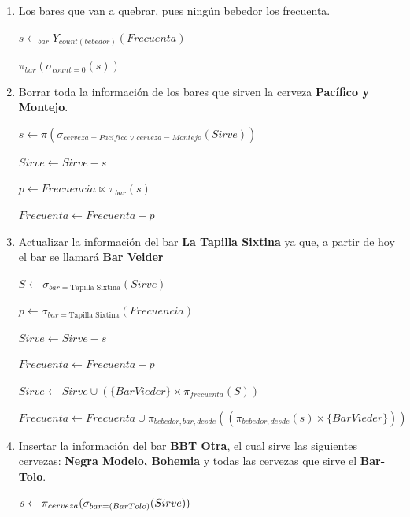 \documentclass{article}
\begin{document}
\begin{enumerate}
\begin{enumerate}
        $p \leftarrow_{cerveza}Y_{count(bebedor)}(Gusta)$
        
        $m \leftarrow Y_{max(count)}(p)$
        
        $c \leftarrow \pi_{cerveza}(\sigma{count=m}(p))$
        
        $c \bowtie Sirve$
        
        
        \item Los bares que van a quebrar, pues ningún bebedor los frecuenta.
        
        $s \leftarrow_{bar} Y_{count(bebedor)}(Frecuenta)$
        
        $\pi_{bar}(\sigma_{count=0}(s))$
        
        \item Borrar toda la información de los bares que sirven la cerveza \textbf{Pacífico y Montejo}.
        
        $s \leftarrow \pi(\sigma_{cerveza=Pacifico \vee cerveza=Montejo}(Sirve))$
        
        $Sirve \leftarrow Sirve - s$
        
        $p \leftarrow Frecuencia \bowtie \pi_{bar}(s)$
        
        $Frecuenta \leftarrow Frecuenta -p$
        
        \item Actualizar la información del bar \textbf{La Tapilla Sixtina} ya que, a partir de hoy el bar se llamará \textbf{Bar Veider}
        
        $S \leftarrow \sigma_{bar=\text{Tapilla Sixtina}}(Sirve)$
        
        $p \leftarrow \sigma_{bar=\text{Tapilla Sixtina}}(Frecuencia)$
        
        $Sirve \leftarrow Sirve - s$
        
        $Frecuenta \leftarrow Frecuenta - p$
        
        $Sirve \leftarrow Sirve \cup(\{ Bar Vieder\} \times \pi_{frecuenta}(S))$
        
        $Frecuenta \leftarrow Frecuenta \cup \pi_{bebedor, bar, desde}((\pi_{bebedor, desde}(s) \times \{ Bar Vieder\}))$
        
        
        \item Insertar la información del bar \textbf{BBT Otra}, el cual sirve las siguientes cervezas: \textbf{Negra Modelo, Bohemia} y todas las cervezas que sirve el \textbf{Bar-Tolo}.
        
        $s \leftarrow \pi_{cerveza}(\sigma_{bar=\text(Bar Tolo)}(Sirve))$
        

\end{enumerate}
\end{enumerate}
\end{document}
